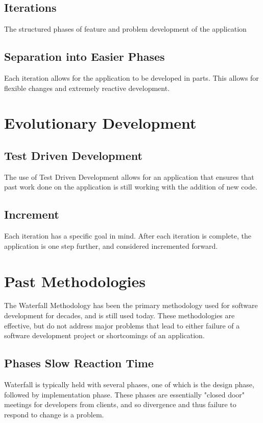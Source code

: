 \documentclass[11pt]{article}
\begin{document}
\begin{doublespace}
\subsection{Iterations} 
The structured phases of feature and problem development of the application

\subsection{Separation into Easier Phases} 
Each iteration allows for the application to be developed in parts. This allows for flexible changes and
extremely reactive development.~\cite{Cao:2010:MDA:1877725.1877730}

\section{Evolutionary Development}

\subsection{Test Driven Development}
The use of Test Driven Development allows for an application that ensures that past work done on the application
is still working with the addition of new code.

\subsection{Increment} 
Each iteration has a specific goal in mind. After each iteration is complete, the application is one
step further, and considered incremented forward.

\section{Past Methodologies}
The Waterfall Methodology has been the primary methodology used for software development for decades, and is still used today.
These methodologies are effective, but do not address major problems that lead to either failure of a software development
project or shortcomings of an application.

\subsection{Phases Slow Reaction Time}
Waterfall is typically held with several phases, one of which is the design phase, followed by implementation
phase. These phases are essentially "closed door" meetings for developers from clients, and so divergence and thus
failure to respond to change is a problem.


\end{doublespace}
\end{document}
